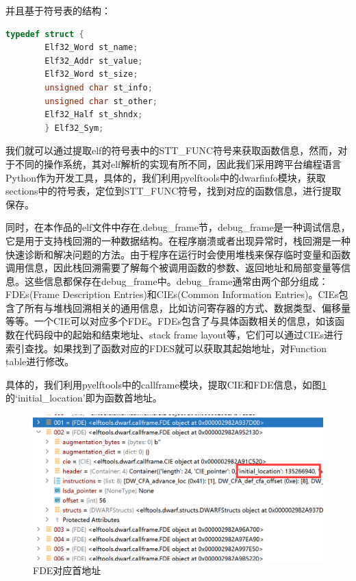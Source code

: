 \documentclass[UTF8,12pt,a4paper]{ctexart}
\numberwithin{figure}{section}
\begin{document}
\par 并且基于符号表的结构：
\begin{lstlisting}[language=C]
    typedef struct { 
        Elf32_Word st_name; 
        Elf32_Addr st_value; 
        Elf32_Word st_size; 
        unsigned char st_info; 
        unsigned char st_other; 
        Elf32_Half st_shndx; 
        } Elf32_Sym;
\end{lstlisting}
\par 我们就可以通过提取elf的符号表中的STT\_FUNC符号来获取函数信息，然而，对于不同的操作系统，其对elf解析的实现有所不同，因此我们采用跨平台编程语言Python作为开发工具，具体的，我们利用pyelftools中的dwarfinfo模块，获取sections中的符号表，定位到STT\_FUNC符号，找到对应的函数信息，进行提取保存。
\par 同时，在本作品的elf文件中存在.debug\_frame节，debug\_frame是一种调试信息，它是用于支持栈回溯的一种数据结构。在程序崩溃或者出现异常时，栈回溯是一种快速诊断和解决问题的方法。由于程序在运行时会使用堆栈来保存临时变量和函数调用信息，因此栈回溯需要了解每个被调用函数的参数、返回地址和局部变量等信息。这些信息都保存在debug\_frame中。debug\_frame通常由两个部分组成：FDEs(Frame Description Entries)和CIEs(Common Information Entries)。CIEs包含了所有与堆栈回溯相关的通用信息，比如访问寄存器的方式、数据类型、偏移量等等。一个CIE可以对应多个FDE。FDEs包含了与具体函数相关的信息，如该函数在代码段中的起始和结束地址、stack frame layout等，它们可以通过CIEs进行索引查找。如果找到了函数对应的FDES就可以获取其起始地址，对Function table进行修改。
\par 具体的，我们利用pyelftools中的callframe模块，提取CIE和FDE信息，如图\ref{id}的‘initial\_location’即为函数首地址。
\begin{figure}
    \centering
    \includegraphics[scale=0.3]{graph/A.png}
    \caption{FDE对应首地址}
    \label{id}
\end{figure}
\end{document}
